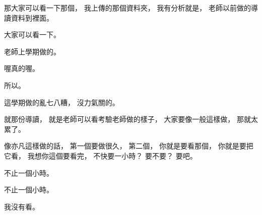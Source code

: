 \hypertarget{w06:cue:3310}{}那大家可以看一下那個，
\hypertarget{w06:cue:3311}{}我上傳的那個資料夾，
\hypertarget{w06:cue:3312}{}我有分析就是，
\hypertarget{w06:cue:3313}{}老師以前做的導讀資料到裡面。

\hypertarget{w06:cue:3314}{}大家可以看一下。

\hypertarget{w06:cue:3315}{}老師上學期做的。

\hypertarget{w06:cue:3316}{}喔真的喔。

\hypertarget{w06:cue:3317}{}所以。

\hypertarget{w06:cue:3318}{}這學期做的亂七八糟，
\hypertarget{w06:cue:3319}{}沒力氣關的。

\hypertarget{w06:cue:3320}{}就那份導讀，
\hypertarget{w06:cue:3321}{}就是老師可以看考驗老師做的樣子，
\hypertarget{w06:cue:3322}{}大家要像一般這樣做，
\hypertarget{w06:cue:3323}{}那就太累了。

\hypertarget{w06:cue:3324}{}像亦凡這樣做的話，
\hypertarget{w06:cue:3325}{}第一個要做很久，
\hypertarget{w06:cue:3326}{}第二個，
\hypertarget{w06:cue:3327}{}你就是要看那個，
\hypertarget{w06:cue:3328}{}你就是要把它看，
\hypertarget{w06:cue:3329}{}我想你這個要看完，
\hypertarget{w06:cue:3330}{}不快要一小時？
\hypertarget{w06:cue:3331}{}要不要？
\hypertarget{w06:cue:3332}{}要吧。

\hypertarget{w06:cue:3333}{}不止一個小時。

\hypertarget{w06:cue:3334}{}不止一個小時。

\hypertarget{w06:cue:3335}{}我沒有看。

